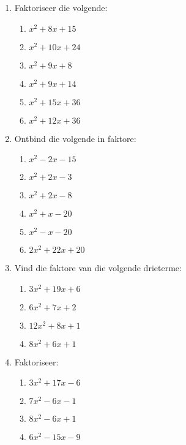 \begin{exercises}{}
{
\begin{enumerate}[itemsep=5pt, label=\textbf{\arabic*}. ] 
\item Faktoriseer die volgende:
\begin{multicols}{2}
\begin{enumerate}[itemsep=5pt, label=\textbf{(\alph*)} ] 
\item ${x}^{2}+8x+15$
\item ${x}^{2}+10x+24$
\item ${x}^{2}+9x+8$
\item ${x}^{2}+9x+14$
\item ${x}^{2}+15x+36$
\item ${x}^{2}+12x+36$
\end{enumerate}
\end{multicols}


\item Ontbind die volgende in faktore:
\begin{multicols}{2}
\begin{enumerate}[itemsep=5pt, label=\textbf{(\alph*)} ] 
\item ${x}^{2}-2x-15$
\item ${x}^{2}+2x-3$
\item ${x}^{2}+2x-8$
\item ${x}^{2}+x-20$
\item ${x}^{2}-x-20$
\item $2{x}^{2}+22x+20$
\end{enumerate}
\end{multicols}


\item Vind die faktore van die volgende drieterme:
\begin{multicols}{2}
\begin{enumerate}[itemsep=5pt, label=\textbf{(\alph*)} ] 
\item $3{x}^{2}+19x+6$
\item $6{x}^{2}+7x+2$
\item $12{x}^{2}+8x+1$
\item $8{x}^{2}+6x+1$
\end{enumerate}
\end{multicols}

\item Faktoriseer:
\begin{multicols}{2}
\begin{enumerate}[itemsep=5pt, label=\textbf{(\alph*)} ] 
\item $3{x}^{2}+17x-6$
\item $7{x}^{2}-6x-1$
\item $8{x}^{2}-6x+1$
\item $6{x}^{2}-15x-9$
\end{enumerate}
\end{multicols}


\end{enumerate}}
\end{exercises}
